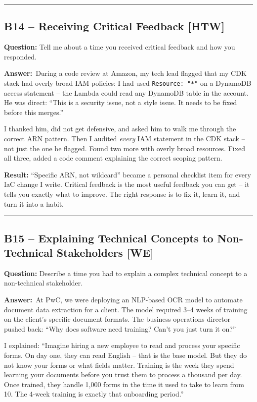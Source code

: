 \documentclass[letterpaper,10pt]{article}
\newlength{\boxwidth}
\newcommand{\bquestionbox}[1]{%
  \vspace{6pt}%
  \noindent\colorbox{bqbg}{%
    \begin{minipage}{\boxwidth}%
      \vspace{3pt}\textbf{\textcolor{orange!70!black}{Question:}} #1\vspace{3pt}%
    \end{minipage}%
  }\vspace{2pt}%
}
\newcommand{\answerlabel}{\noindent\textbf{\textcolor{answerblue}{Answer:}}~}
\begin{document}
\rule{\linewidth}{0.2pt}

\subsection*{B14 -- Receiving Critical Feedback \textmd{[HTW]}}

\bquestionbox{Tell me about a time you received critical feedback and how you responded.}

\answerlabel During a code review at Amazon, my tech lead flagged that my CDK stack had overly broad IAM policies: I had used \texttt{Resource: "*"} on a DynamoDB access statement -- the Lambda could read any DynamoDB table in the account. He was direct: ``This is a security issue, not a style issue. It needs to be fixed before this merges.''

I thanked him, did not get defensive, and asked him to walk me through the correct ARN pattern. Then I audited \textit{every} IAM statement in the CDK stack -- not just the one he flagged. Found two more with overly broad resources. Fixed all three, added a code comment explaining the correct scoping pattern.

\textbf{Result:} ``Specific ARN, not wildcard'' became a personal checklist item for every IaC change I write. Critical feedback is the most useful feedback you can get -- it tells you exactly what to improve. The right response is to fix it, learn it, and turn it into a habit.

\rule{\linewidth}{0.2pt}

\subsection*{B15 -- Explaining Technical Concepts to Non-Technical Stakeholders \textmd{[WE]}}

\bquestionbox{Describe a time you had to explain a complex technical concept to a non-technical stakeholder.}

\answerlabel At PwC, we were deploying an NLP-based OCR model to automate document data extraction for a client. The model required 3--4 weeks of training on the client's specific document formats. The business operations director pushed back: ``Why does software need training? Can't you just turn it on?''

I explained: ``Imagine hiring a new employee to read and process your specific forms. On day one, they can read English -- that is the base model. But they do not know your forms or what fields matter. Training is the week they spend learning your documents before you trust them to process a thousand per day. Once trained, they handle 1,000 forms in the time it used to take to learn from 10. The 4-week training is exactly that onboarding period.''
\end{document}
